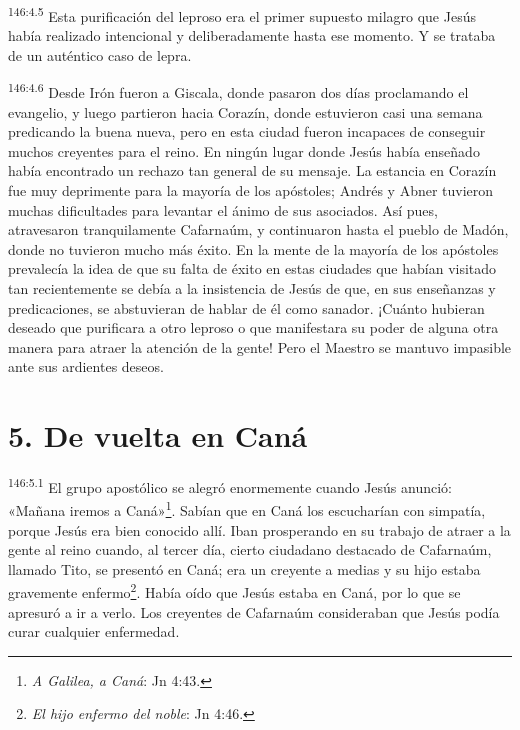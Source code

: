 \par 
\textsuperscript{146:4.5} Esta purificación del leproso era el primer supuesto milagro que Jesús había realizado intencional y deliberadamente hasta ese momento. Y se trataba de un auténtico caso de lepra.

\par 
\textsuperscript{146:4.6} Desde Irón fueron a Giscala, donde pasaron dos días proclamando el evangelio, y luego partieron hacia Corazín, donde estuvieron casi una semana predicando la buena nueva, pero en esta ciudad fueron incapaces de conseguir muchos creyentes para el reino. En ningún lugar donde Jesús había enseñado había encontrado un rechazo tan general de su mensaje. La estancia en Corazín fue muy deprimente para la mayoría de los apóstoles; Andrés y Abner tuvieron muchas dificultades para levantar el ánimo de sus asociados. Así pues, atravesaron tranquilamente Cafarnaúm, y continuaron hasta el pueblo de Madón, donde no tuvieron mucho más éxito. En la mente de la mayoría de los apóstoles prevalecía la idea de que su falta de éxito en estas ciudades que habían visitado tan recientemente se debía a la insistencia de Jesús de que, en sus enseñanzas y predicaciones, se abstuvieran de hablar de él como sanador. ¡Cuánto hubieran deseado que purificara a otro leproso o que manifestara su poder de alguna otra manera para atraer la atención de la gente! Pero el Maestro se mantuvo impasible ante sus ardientes deseos.

\section*{5. De vuelta en Caná}
\par 
\textsuperscript{146:5.1} El grupo apostólico se alegró enormemente cuando Jesús anunció: «Mañana iremos a Caná»\footnote{\textit{A Galilea, a Caná}: Jn 4:43.}. Sabían que en Caná los escucharían con simpatía, porque Jesús era bien conocido allí. Iban prosperando en su trabajo de atraer a la gente al reino cuando, al tercer día, cierto ciudadano destacado de Cafarnaúm, llamado Tito, se presentó en Caná; era un creyente a medias y su hijo estaba gravemente enfermo\footnote{\textit{El hijo enfermo del noble}: Jn 4:46.}. Había oído que Jesús estaba en Caná, por lo que se apresuró a ir a verlo. Los creyentes de Cafarnaúm consideraban que Jesús podía curar cualquier enfermedad.

